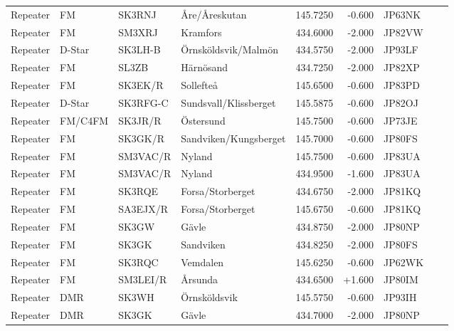 \begin{longtable}{llllrrlcl}
	Repeater & FM              & SK3RNJ   & Åre/Åreskutan          &   145.7250 &   -0.600 & JP63NK &  &  \\
	Repeater & FM              & SM3XRJ   & Kramfors               &   434.6000 &   -2.000 & JP82VW &  &  \\
	Repeater & D-Star          & SK3LH-B  & Örnsköldsvik/Malmön    &   434.5750 &   -2.000 & JP93LF &  &  \\
	Repeater & FM              & SL3ZB    & Härnösand              &   434.7250 &   -2.000 & JP82XP &  &  \\
	Repeater & FM              & SK3EK/R  & Sollefteå              &   145.6500 &   -0.600 & JP83PD &  &  \\
	Repeater & D-Star          & SK3RFG-C & Sundsvall/Klissberget  &   145.5875 &   -0.600 & JP82OJ &  &  \\
	Repeater & FM/C4FM         & SK3JR/R  & Östersund              &   145.7500 &   -0.600 & JP73JE &  &  \\
	Repeater & FM              & SK3GK/R  & Sandviken/Kungsberget  &   145.7000 &   -0.600 & JP80FS &  &  \\
	Repeater & FM              & SM3VAC/R & Nyland                 &   145.7500 &   -0.600 & JP83UA &  &  \\
	Repeater & FM              & SM3VAC/R & Nyland                 &   434.9500 &   -1.600 & JP83UA &  &  \\
	Repeater & FM              & SK3RQE   & Forsa/Storberget       &   434.6750 &   -2.000 & JP81KQ &  &  \\
	Repeater & FM              & SA3EJX/R & Forsa/Storberget       &   145.6750 &   -0.600 & JP81KQ &  &  \\
	Repeater & FM              & SK3GW    & Gävle                  &   434.8750 &   -2.000 & JP80NP &  &  \\
	Repeater & FM              & SK3GK    & Sandviken              &   434.8250 &   -2.000 & JP80FS &  &  \\
	Repeater & FM              & SK3RQC   & Vemdalen               &   145.6250 &   -0.600 & JP62WK &  &  \\
	Repeater & FM              & SM3LEI/R & Årsunda                &   434.6500 &   +1.600 & JP80IM &  &  \\
	Repeater & DMR             & SK3WH    & Örnsköldsvik           &   145.5750 &   -0.600 & JP93IH &  &  \\
	Repeater & DMR             & SK3GK    & Gävle                  &   434.7000 &   -2.000 & JP80NP &  &  \\

\end{longtable}
